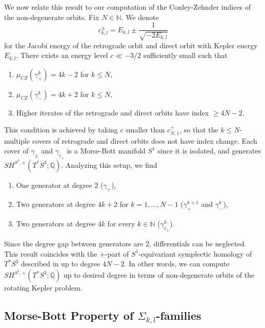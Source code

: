 \documentclass{amsart}
\newcommand{\Q}{\mathbb{Q}}
\newcommand{\g}{\gamma}
\begin{document}
We now relate this result to our computation of the Conley-Zehnder indices of the non-degenerate orbits.
Fix $N\in\mathbb{N}$.
We denote
$$
c^\pm_{k,l} = E_{k,l}\pm \frac{1}{\sqrt{-2E_{k,l}}}
$$
for the Jacobi energy of the retrograde orbit and direct orbit with Kepler energy $E_{k,l}$.
There exists an energy level $c\ll -3/2$ sufficiently small such that
\begin{enumerate}
	\item $\mu_{CZ}(\g_+^k)=4k-2$ for $k\leq N$,
	\item $\mu_{CZ}(\g_-^k)=4k+2$ for $k\leq N$,
	\item Higher iterates of the retrograde and direct orbits have index $\geq 4N-2$.
\end{enumerate}
This condition is achieved by taking $c$ smaller than $c^+_{N,1}$, so that the $k\leq N$-multiple covers of retrograde and direct orbits does not have index change.
Each cover of $\g_\pm$ and $\g_{c_\pm}$ is a Morse-Bott manifold $S^1$ since it is isolated, and generates $SH^{S^1,+}(T^*S^3;\Q)$.
Analyzing this setup, we find
\begin{enumerate}
	\item One generator at degree $2$ ($\g_+$),
	\item Two generators at degree $4k+2$ for $k=1,\ldots,N-1$ ($\g_+^{k+1}$ and $\g_-^k$),
	\item Two generators at degree $4k$ for every $k\in\mathbb{N}$ ($\g_{c_\pm}^k$).
\end{enumerate}
Since the degree gap between generators are $2$, differentials can be neglected.
This result coincides with the $+$-part of $S^1$-equivariant symplectic homology of $T^*S^3$ described in  up to degree $4N-2$.
In other words, we can compute $SH^{S^1,+}(T^*S^3;\Q)$ up to desired degree in terms of non-degenerate orbits of the rotating Kepler problem.



\subsection{Morse-Bott Property of $\Sigma_{k,l}$-families}\label{Subsection - Morse-Bott property}
\end{document}
